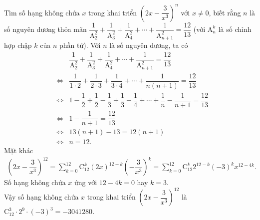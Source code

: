 \begin{bt}%
 Tìm số hạng không chứa $x$ trong khai triển $\left(2x-\dfrac{3}{x^3}\right)^n$ với $x\neq 0$, biết rằng $n$ là số nguyên dương thỏa mãn $\dfrac{1}{\mathrm{A}_2^2}+\dfrac{1}{\mathrm{A}_3^2}+\dfrac{1}{\mathrm{A}_4^2}+\cdots+\dfrac{1}{\mathrm{A}_{n+1}^2}=\dfrac{12}{13}$ (với $\mathrm{A}_n^k$ là số chỉnh hợp chập $k$ của $n$ phần tử).
 \loigiai
  {
  Với $n$ là số nguyên dương, ta có
  \allowdisplaybreaks
  \begin{eqnarray*}
   && \dfrac{1}{\mathrm{A}_2^2}+\dfrac{1}{\mathrm{A}_3^2}+\dfrac{1}{\mathrm{A}_4^2}+\cdots+\dfrac{1}{\mathrm{A}_{n+1}^2}=\dfrac{12}{13} \\
   &\Leftrightarrow & \dfrac{1}{1\cdot 2}+\dfrac{1}{2\cdot 3}+\dfrac{1}{3\cdot 4}+\cdots +\dfrac{1}{n(n+1)}=\dfrac{12}{13}\\
   &\Leftrightarrow & 1-\dfrac{1}{2}+\dfrac{1}{2}-\dfrac{1}{3}+\dfrac{1}{3}-\dfrac{1}{4}+\cdots+\dfrac{1}{n}-\dfrac{1}{n+1}=\dfrac{12}{13}\\
   &\Leftrightarrow & 1-\dfrac{1}{n+1}=\dfrac{12}{13}\\
   &\Leftrightarrow & 13(n+1)-13=12(n+1)\\
   &\Leftrightarrow & n=12.
  \end{eqnarray*}
  Mặt khác
  \begin{eqnarray*}
   \left(2x-\dfrac{3}{x^3}\right)^{12}=\sum\limits_{k=0}^{12}\mathrm{C}_{12}^k(2x)^{12-k}\left(-\dfrac{3}{x^3}\right)^k = \sum\limits_{k=0}^{12}\mathrm{C}_{12}^k2^{12-k}(-3)^kx^{12-4k}.
  \end{eqnarray*}
  Số hạng không chứa $x$ ứng với $12-4k=0$ hay $k=3$.\\
  Vậy số hạng không chứa $x$ trong khai triển $\left(2x-\dfrac{3}{x^3}\right)^{12}$ là $\mathrm{C}_{12}^3\cdot 2^9 \cdot (-3)^3=-3041280$.
  }
\end{bt}

